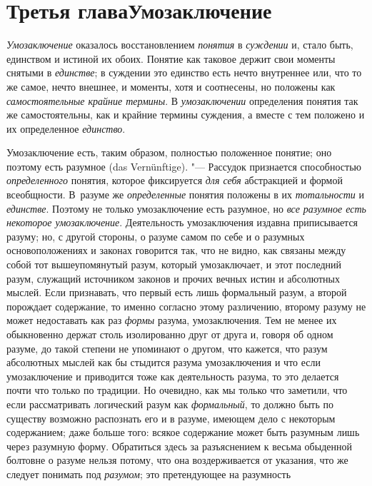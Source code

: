 {{\chapter[Третья глава Умозаключение]{Третья глава\newline Умозаключение}
{\em Умозаключение}
оказалось восстановлением
{\em понятия} в
{\em суждении} и, стало
быть, единством и истиной их обоих. Понятие как таковое держит свои моменты
снятыми в {\em единстве};
в суждении это единство есть нечто внутреннее или, что то же
самое, нечто внешнее, и моменты, хотя и соотнесены, но положены как
{\em самостоятельные крайние термины}.
В {\em умозаключении}
определения понятия так же самостоятельны, как и крайние
термины суждения, а вместе с тем положено и их определенное
{\em единство}.

Умозаключение есть, таким образом, полностью положенное
понятие; оно поэтому есть разумное (das Vernünftige). "---
Рассудок признается способностью
{\em определенного}
понятия, которое фиксируется
{\em для себя} абстракцией и
формой всеобщности. В~разуме же
{\em определенные}
понятия положены в их
{\em тотальности} и
{\em единстве}. Поэтому
не только умозаключение есть разумное, но
{\em все разумное есть некоторое
умозаключение}. Деятельность умозаключения издавна
приписывается разуму; но, с другой стороны, о разуме самом по себе и о
разумных основоположениях и законах говорится так, что не видно, как
связаны между собой тот вышеупомянутый разум, который умозаключает, и этот
последний разум, служащий источником законов и прочих вечных истин и
абсолютных мыслей. Если признавать, что первый есть лишь формальный разум,
а второй порождает содержание, то именно согласно этому различению, второму
разуму не может недоставать как раз
{\em формы} разума,
умозаключения. Тем не менее их обыкновенно держат столь изолированно друг
от друга и, говоря об одном разуме, до такой степени не упоминают о
другом, что кажется, что разум абсолютных мыслей как бы
стыдится разума умозаключения и что если умозаключение и приводится тоже
как деятельность разума, то это делается почти что только по традиции. Но
очевидно, как мы только что заметили, что если рассматривать логический
разум как {\em формальный},
то должно быть по существу возможно распознать его и в
разуме, имеющем дело с некоторым содержанием; даже больше того: всякое
содержание может быть разумным лишь через разумную форму. Обратиться здесь
за разъяснением к весьма обыденной болтовне о разуме нельзя потому, что она
воздерживается от указания, что же следует понимать под
{\em разумом}; это
претендующее на разумность
}}
